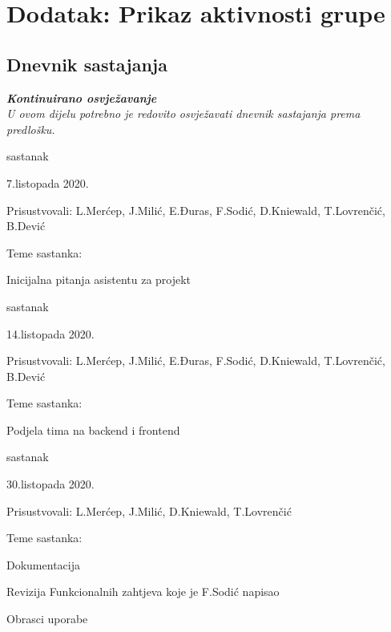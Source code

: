 \chapter*{Dodatak: Prikaz aktivnosti grupe}
		
		\section*{Dnevnik sastajanja}
		
		\textbf{\textit{Kontinuirano osvježavanje}}\\
		
		 \textit{U ovom dijelu potrebno je redovito osvježavati dnevnik sastajanja prema predlošku.}
		
		\begin{packed_enum}
			\item  sastanak
			
			\item[] \begin{packed_item}
				\item 7.listopada 2020.
				\item Prisustvovali: L.Merćep, J.Milić, E.Đuras, F.Sodić, D.Kniewald, T.Lovrenčić, B.Dević
				\item Teme sastanka:
				\begin{packed_item}
					\item  Inicijalna pitanja asistentu za projekt
				\end{packed_item}
			\end{packed_item}
			
			\item  sastanak
			\item[] \begin{packed_item}
				\item 14.listopada 2020.
				\item Prisustvovali: L.Merćep, J.Milić, E.Đuras, F.Sodić, D.Kniewald, T.Lovrenčić, B.Dević
				\item Teme sastanka:
				\begin{packed_item}
					\item  Podjela tima na backend i frontend
				\end{packed_item}
			\end{packed_item}
			
			\item  sastanak
			\item[] \begin{packed_item}
				\item 30.listopada 2020.
				\item Prisustvovali: L.Merćep, J.Milić, D.Kniewald, T.Lovrenčić
				\item Teme sastanka:
				\begin{packed_item}
					\item  Dokumentacija
					\item Revizija Funkcionalnih zahtjeva koje je F.Sodić napisao
					\item Obrasci uporabe
				\end{packed_item}
			\end{packed_item}
			

\end{packed_enum}
